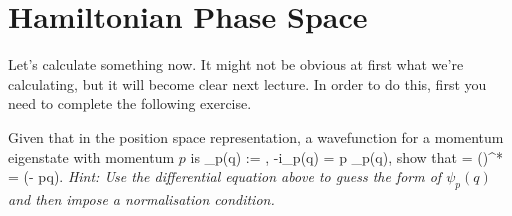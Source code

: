 \section{Hamiltonian Phase Space}

Let's calculate something now. It might not be obvious at first what we're calculating, but it will become clear next lecture. In order to do this, first you need to complete the following exercise.

\bbox 
    Given that in the position space representation, a wavefunction for a momentum eigenstate with momentum $p$ is 
    \bse 
        \psi_p(q) := , \qquad -i\hbar{}\psi_p(q) = p \psi_p(q),
    \ese 
    show that 
    \be 
    \label{eqn:pqInnerProduct}
         = ()^* =  \exp\bigg(- pq\bigg).
    \ee 
    \textit{Hint: Use the differential equation above to guess the form of $\psi_p(q)$ and then impose a normalisation condition.}
\ebox 


